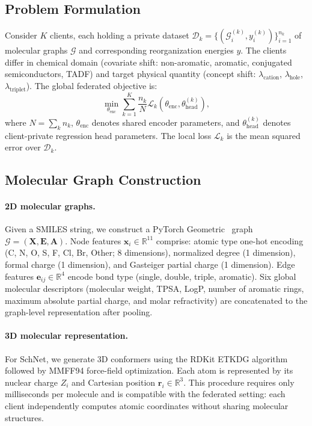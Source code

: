 \documentclass[twocolumn]{article}
\newcommand{\lamhole}{\lambda_{\text{hole}}}
\newcommand{\lamcat}{\lambda_{\text{cation}}}
\newcommand{\lamtrip}{\lambda_{\text{triplet}}}
\newcommand{\thetaenc}{\theta_{\text{enc}}}
\newcommand{\thetahead}{\theta_{\text{head}}}
\begin{document}
\subsection{Problem Formulation}\label{sec:formulation}

Consider $K$ clients, each holding a private dataset $\mathcal{D}_k = \{(\mathcal{G}_i^{(k)}, y_i^{(k)})\}_{i=1}^{n_k}$ of molecular graphs $\mathcal{G}$ and corresponding reorganization energies $y$.
The clients differ in chemical domain (covariate shift: non-aromatic, aromatic, conjugated semiconductors, TADF) and target physical quantity (concept shift: $\lamcat$, $\lamhole$, $\lamtrip$).
The global federated objective is:
\begin{equation}\label{eq:fed_obj}
  \min_{\thetaenc} \sum_{k=1}^{K} \frac{n_k}{N} \mathcal{L}_k(\thetaenc, \thetahead^{(k)}),
\end{equation}
where $N = \sum_k n_k$, $\thetaenc$ denotes shared encoder parameters, and $\thetahead^{(k)}$ denotes client-private regression head parameters.
The local loss $\mathcal{L}_k$ is the mean squared error over $\mathcal{D}_k$.

\subsection{Molecular Graph Construction}\label{sec:graph}

\paragraph{2D molecular graphs.}
Given a SMILES string, we construct a PyTorch Geometric~\cite{RDKit2023} graph $\mathcal{G} = (\mathbf{X}, \mathbf{E}, \mathbf{A})$.
Node features $\mathbf{x}_i \in \mathbb{R}^{11}$ comprise: atomic type one-hot encoding (C, N, O, S, F, Cl, Br, Other; 8 dimensions), normalized degree (1 dimension), formal charge (1 dimension), and Gasteiger partial charge (1 dimension).
Edge features $\mathbf{e}_{ij} \in \mathbb{R}^{4}$ encode bond type (single, double, triple, aromatic).
Six global molecular descriptors (molecular weight, TPSA, LogP, number of aromatic rings, maximum absolute partial charge, and molar refractivity) are concatenated to the graph-level representation after pooling.

\paragraph{3D molecular representation.}
For SchNet, we generate 3D conformers using the RDKit ETKDG algorithm~\cite{RDKit2023} followed by MMFF94 force-field optimization.
Each atom is represented by its nuclear charge $Z_i$ and Cartesian position $\mathbf{r}_i \in \mathbb{R}^3$.
This procedure requires only milliseconds per molecule and is compatible with the federated setting: each client independently computes atomic coordinates without sharing molecular structures.
\end{document}
